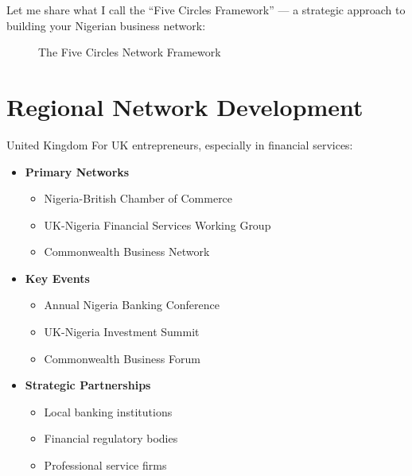 Let me share what I call the ``Five Circles Framework'' --- a strategic approach to building your Nigerian business network:

\begin{figure}[h]
    \centering
    \caption{The Five Circles Network Framework}
    \label{fig:five-circles}
\end{figure}

\section{Regional Network Development}\label{sec:regional-network-development}

\begin{regionalbox}{United Kingdom}
For UK entrepreneurs, especially in financial services:

\begin{itemize}
    \item \textbf{Primary Networks}
    \begin{itemize}
        \item Nigeria-British Chamber of Commerce
        \item UK-Nigeria Financial Services Working Group
        \item Commonwealth Business Network
    \end{itemize}

    \item \textbf{Key Events}
    \begin{itemize}
        \item Annual Nigeria Banking Conference
        \item UK-Nigeria Investment Summit
        \item Commonwealth Business Forum
    \end{itemize}

    \item \textbf{Strategic Partnerships}
    \begin{itemize}
        \item Local banking institutions
        \item Financial regulatory bodies
        \item Professional service firms
    \end{itemize}
\end{itemize}
\end{regionalbox}

